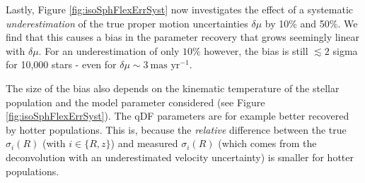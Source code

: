 Lastly, Figure \ref{fig:isoSphFlexErrSyst} now investigates the effect of a systematic \emph{underestimation} of the true proper motion uncertainties $\delta \mu$ by 10\% and 50\%. We find that this causes a bias in the parameter recovery that grows seemingly linear with $\delta \mu$. For an underestimation of only $10\%$ however, the bias is still $\lesssim 2$ sigma for 10,000 stars \Wilma{[TO DO: Check]} - even for $\delta \mu \sim 3~\text{mas yr}^{-1}$.

The size of the bias also depends on the kinematic temperature of the stellar population and the model parameter considered (see Figure \ref{fig:isoSphFlexErrSyst}). The qDF parameters are for example better recovered by hotter populations. This is, because the \emph{relative} difference between the true $\sigma_i(R)$ (with $i \in \{R,z\}$) and measured $\sigma_i(R)$ (which comes from the deconvolution with an underestimated velocity uncertainty) is smaller for hotter populations. 



